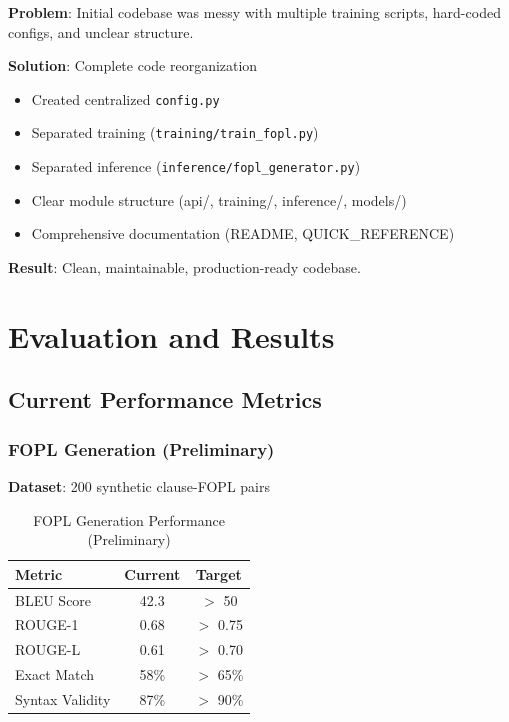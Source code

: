 \documentclass[12pt,a4paper]{article}
\begin{document}
\textbf{Problem}: Initial codebase was messy with multiple training scripts, hard-coded configs, and unclear structure.

\textbf{Solution}: Complete code reorganization
\begin{itemize}
    \item Created centralized \texttt{config.py}
    \item Separated training (\texttt{training/train\_fopl.py})
    \item Separated inference (\texttt{inference/fopl\_generator.py})
    \item Clear module structure (api/, training/, inference/, models/)
    \item Comprehensive documentation (README, QUICK\_REFERENCE)
\end{itemize}

\textbf{Result}: Clean, maintainable, production-ready codebase.

\newpage

\section{Evaluation and Results}

\subsection{Current Performance Metrics}

\subsubsection{FOPL Generation (Preliminary)}

\textbf{Dataset}: 200 synthetic clause-FOPL pairs

\begin{table}[H]
\centering
\begin{tabular}{|l|c|c|}
\hline
\textbf{Metric} & \textbf{Current} & \textbf{Target} \\
\hline
BLEU Score & 42.3 & $>$ 50 \\
ROUGE-1 & 0.68 & $>$ 0.75 \\
ROUGE-L & 0.61 & $>$ 0.70 \\
Exact Match & 58\% & $>$ 65\% \\
Syntax Validity & 87\% & $>$ 90\% \\
\hline
\end{tabular}
\caption{FOPL Generation Performance (Preliminary)}
\end{table}
\end{document}
